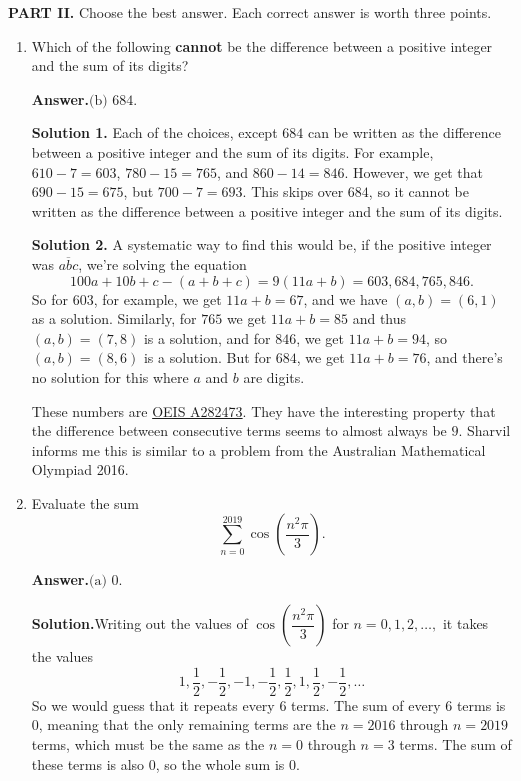 \documentclass[11pt,paper=letter]{scrartcl}
\newcommand{\ans}{{\sffamily \bfseries Answer.}\;}
\newcommand{\sol}{{\sffamily \bfseries Solution.}\;}
\newcommand{\soln}[1]{{\sffamily \bfseries Solution #1.}\;}
\newcommand{\rem}[1]{{\small \sffamily \sansmath {\bfseries Remark.} #1}}
\begin{document}
\noindent\textbf{PART II.} Choose the best answer. Each correct answer is worth three points.

\begin{enumerate}[align=left,leftmargin=*,resume]

\item Which of the following \textbf{cannot} be the difference between a positive integer and the sum of its digits?


\ans $\boxed{\text{(b) }684}$.

\soln1 Each of the choices, except $684$ can be written as the difference between a positive integer and the sum of its digits. For example, $610 - 7 = 603$, $780 - 15 = 765$, and $860 - 14 = 846$. However, we get that $690 - 15 = 675$, but $700 - 7 = 693$. This skips over $684$, so it cannot be written as the difference between a positive integer and the sum of its digits.

\soln2 A systematic way to find this would be, if the positive integer was $\overline{abc}$, we're solving the equation
\[
  100a + 10b + c - (a + b + c) = 9(11a + b) = 603, 684, 765, 846.
\]
So for $603$, for example, we get $11a + b = 67$, and we have $(a, b) = (6, 1)$ as a solution. Similarly, for $765$ we get $11a + b = 85$ and thus $(a, b) = (7, 8)$ is a solution, and for $846$, we get $11a + b = 94$, so $(a, b) = (8, 6)$ is a solution. But for $684$, we get $11a + b = 76$, and there's no solution for this where $a$ and $b$ are digits.

\rem{These numbers are \href{https://oeis.org/A282473}{OEIS A282473}. They have the interesting property that the difference between consecutive terms seems to almost always be $9$. Sharvil informs me this is similar to a problem from the Australian Mathematical Olympiad 2016.}

\item Evaluate the sum
\[
  \sum_{n=0}^{2019}\cos\left(\dfrac{n^2\pi}{3}\right).
\]


\ans $\boxed{\text{(a) }0}$.

\sol Writing out the values of $\cos\left(\dfrac{n^2\pi}{3}\right)$ for $n = 0, 1, 2, \ldots,$ it takes the values
\[
  1, \frac{1}{2}, -\frac{1}{2}, -1, -\frac{1}{2}, \frac{1}{2}, 1, \frac{1}{2}, -\frac{1}{2}, \ldots
\]
So we would guess that it repeats every $6$ terms. The sum of every $6$ terms is $0$, meaning that the only remaining terms are the $n =2016$ through $n = 2019$ terms, which must be the same as the $n = 0$ through $n = 3$ terms. The sum of these terms is also $0$, so the whole sum is $0$.


\end{enumerate}
\end{document}
